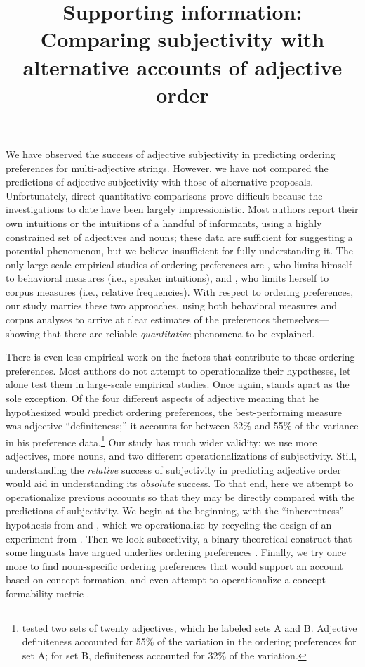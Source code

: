 \documentclass[12pt]{article}
\title{Supporting information: Comparing subjectivity with alternative accounts of adjective order}
\date{}
\begin{document}
\maketitle

We have observed the success of adjective subjectivity in predicting ordering preferences for multi-adjective strings. However, we have not compared the predictions of adjective subjectivity with those of alternative proposals. Unfortunately, direct quantitative comparisons prove difficult because the investigations to date have been largely impressionistic. Most authors report their own intuitions or the intuitions of a handful of informants, using a highly constrained set of adjectives and nouns; these data are sufficient for suggesting a potential phenomenon, but we believe insufficient for fully understanding it. The only large-scale empirical studies of ordering preferences are \citet{martin1969}, who limits himself to behavioral measures (i.e., speaker intuitions), and \citet{wulff2003}, who limits herself to corpus measures (i.e., relative frequencies). With respect to ordering preferences, our study marries these two approaches, using both behavioral measures and corpus analyses to arrive at clear estimates of the preferences themselves---showing that there are reliable \emph{quantitative} phenomena to be explained.

There is even less empirical work on the factors that contribute to these ordering preferences. Most authors do not attempt to operationalize their hypotheses, let alone test them in large-scale empirical studies. Once again, \citet{martin1969} stands apart as the sole exception. Of the four different aspects of adjective meaning that he hypothesized would predict ordering preferences, the best-performing measure was adjective ``definiteness;'' it accounts for between 32\% and 55\% of the variance in his preference data.\footnote{\citet{martin1969} tested two sets of twenty adjectives, which he labeled sets A and B. Adjective definiteness accounted for 55\% of the variation in the ordering preferences for set A; for set B, definiteness accounted for 32\% of the variation.} Our study has much wider validity: we use more adjectives, more nouns, and two different operationalizations of subjectivity. Still, understanding the \emph{relative} success of subjectivity in predicting adjective order would aid in understanding its \emph{absolute} success. To that end, here we attempt to operationalize previous accounts so that they may be directly compared with the predictions of subjectivity. We begin at the beginning, with the ``inherentness'' hypothesis from \citet{sweet1898} and \citet{whorf1945}, which we operationalize by recycling the design of an experiment from \citet{martin1969}. Then we look subsectivity, a binary theoretical construct that some linguists have argued underlies ordering preferences \citep[e.g.,][]{truswell2009}. Finally, we try once more to find noun-specific ordering preferences that would support an account based on concept formation, and even attempt to operationalize a concept-formability metric \citep{McNally2004,bouchard2005,svenonius2008}.
\end{document}
